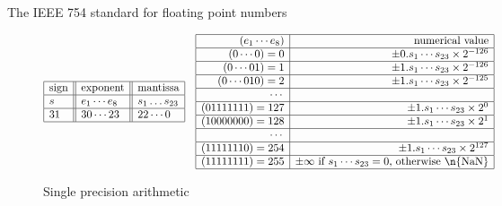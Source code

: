  {The IEEE 754 standard for floating point numbers}
\label{sec:ieee754}

\begin{figure}
  \[
  \begin{array}{| l || l || l |}
    \hline
    \hbox{sign}&\hbox{exponent}&\hbox{mantissa}\\
    \hline
    s&e_1\cdots e_8&s_1\dots s_{23}\\
    \hline
    31&30\cdots 23&22\cdots 0\\
    \hline
  \end{array}\quad
  \begin{array}{|r|r|}
    \hline
    (e_1\cdots e_8)&\hbox{numerical value}\\
    \hline
    (0\cdots0)=0& \pm 0.s_1\cdots s_{23}\times 2^{-126}\\
    \hline
    (0\cdots 01)=1& \pm 1.s_1\cdots s_{23}\times 2^{-126}\\
    \hline
    (0\cdots 010)=2& \pm 1.s_1\cdots s_{23}\times 2^{-125}\\
    \hline
    \cdots&\\
    \hline
    (01111111)=127& \pm 1.s_1\cdots s_{23}\times 2^{0}\\
    \hline
    (10000000)=128& \pm 1.s_1\cdots s_{23}\times 2^{1}\\
    \hline
    \cdots&\\
    \hline
    (11111110)=254& \pm 1.s_1\cdots s_{23}\times 2^{127}\\
    \hline
    (11111111)=255& \hbox{$\pm\infty$ if $s_1\cdots s_{23}=0$, otherwise \n{NaN}} \\
    \hline
  \end{array}
  \]
  \caption{Single precision arithmetic}
  \label{fig:single-precision}
\end{figure}

